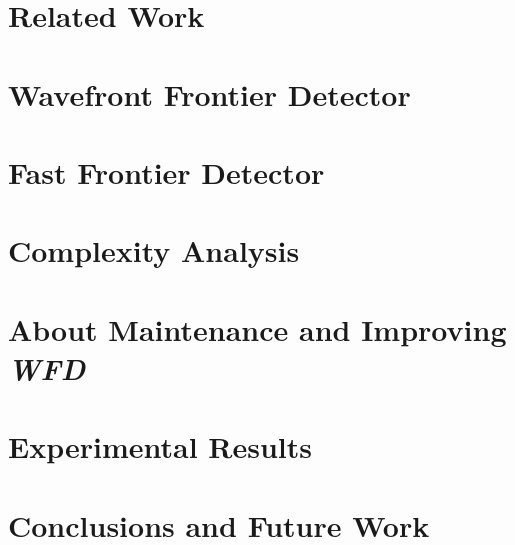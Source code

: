 \documentclass[masters,oneside,usenames,dvipsnames]{BIUCS}
\def\WFD{\emph{WFD}\xspace}
\begin{document}
\chapter{Related Work}
\label{chap:related_work}


\chapter{Wavefront Frontier Detector}
\label{chap:wfd}


\chapter{Fast Frontier Detector}
\label{chap:ffd}


\chapter{Complexity Analysis}
\label{chap:complexity}


\chapter{About Maintenance and Improving \WFD}
\label{chap:maintenance}


\chapter{Experimental Results}
\label{chap:results}


\chapter{Conclusions and Future Work}
\label{chap:conclusions}





 
 \nocite{*}
 



%
%



\end{document}
